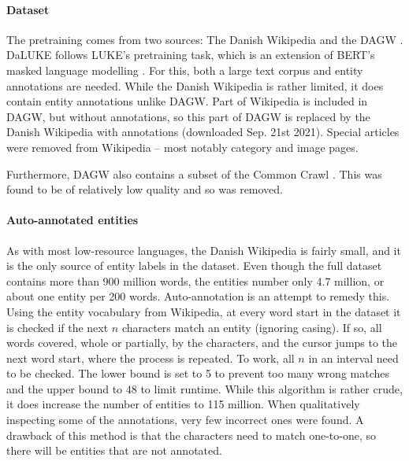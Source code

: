 \documentclass[10pt, a4paper]{article}
\begin{document}
{\paragraph{Dataset}
The pretraining comes from two sources: The Danish Wikipedia and the DAGW \cite{derc2021giga}.
DaLUKE follows LUKE's pretraining task, which is an extension of BERT's masked language modelling \cite{devlin2019bert} \cite{yamada2020luke}.
For this, both a large text corpus and entity annotations are needed.
While the Danish Wikipedia is rather limited, it does contain entity annotations unlike DAGW.
Part of Wikipedia is included in DAGW, but without annotations, so this part of DAGW is replaced by the Danish Wikipedia with annotations (downloaded Sep. 21st 2021).
Special articles were removed from Wikipedia -- most notably category and image pages.

Furthermore, DAGW also contains a subset of the Common Crawl \cite{cc}.
This was found to be of relatively low quality and so was removed.

\paragraph{Auto-annotated entities}
As with most low-resource languages, the Danish Wikipedia is fairly small, and it is the only source of entity labels in the dataset.
Even though the full dataset contains more than 900 million words, the entities number only 4.7 million, or about one entity per 200 words.
Auto-annotation is an attempt to remedy this.
Using the entity vocabulary from Wikipedia, at every word start in the dataset it is checked if the next $ n $ characters match an entity (ignoring casing).
If so, all words covered, whole or partially, by the characters, and the cursor jumps to the next word start, where the process is repeated.
To work, all $ n $ in an interval need to be checked.
The lower bound is set to 5 to prevent too many wrong matches and the upper bound to 48 to limit runtime.
While this algorithm is rather crude, it does increase the number of entities to 115 million.
When qualitatively inspecting some of the annotations, very few incorrect ones were found.
A drawback of this method is that the characters need to match one-to-one, so there will be entities that are not annotated.

}
\end{document}
